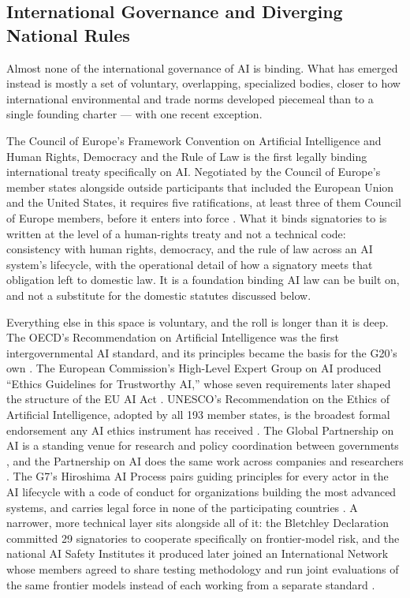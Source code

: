 \subsection{International Governance and Diverging National Rules}
\label{sec:8.7.8}
Almost none of the international governance of AI is binding. What has emerged instead is mostly a set of voluntary, overlapping, specialized bodies, closer to how international environmental and trade norms developed piecemeal than to a single founding charter — with one recent exception.

The Council of Europe's Framework Convention on Artificial Intelligence and Human Rights, Democracy and the Rule of Law is the first legally binding international treaty specifically on AI. Negotiated by the Council of Europe's member states alongside outside participants that included the European Union and the United States, it requires five ratifications, at least three of them Council of Europe members, before it enters into force \autocite{coe2024framework}. What it binds signatories to is written at the level of a human-rights treaty and not a technical code: consistency with human rights, democracy, and the rule of law across an AI system's lifecycle, with the operational detail of how a signatory meets that obligation left to domestic law. It is a foundation binding AI law can be built on, and not a substitute for the domestic statutes discussed below.

Everything else in this space is voluntary, and the roll is longer than it is deep. The OECD's Recommendation on Artificial Intelligence was the first intergovernmental AI standard, and its principles became the basis for the G20's own \autocite{oecd2019recommendation}. The European Commission's High-Level Expert Group on AI produced “Ethics Guidelines for Trustworthy AI,” whose seven requirements later shaped the structure of the EU AI Act \autocite{aihleg2019ethics}. UNESCO's Recommendation on the Ethics of Artificial Intelligence, adopted by all 193 member states, is the broadest formal endorsement any AI ethics instrument has received \autocite{unesco2021recommendation}. The Global Partnership on AI is a standing venue for research and policy coordination between governments \autocite{gpai2020joint}, and the Partnership on AI does the same work across companies and researchers \autocite{deepmind2016partnership}. The G7's Hiroshima AI Process pairs guiding principles for every actor in the AI lifecycle with a code of conduct for organizations building the most advanced systems, and carries legal force in none of the participating countries \autocite{g72023hiroshima}. A narrower, more technical layer sits alongside all of it: the Bletchley Declaration committed 29 signatories to cooperate specifically on frontier-model risk, and the national AI Safety Institutes it produced later joined an International Network whose members agreed to share testing methodology and run joint evaluations of the same frontier models instead of each working from a separate standard \autocite{aisafetysummit2023bletchley} \autocite{nist2024network}.

